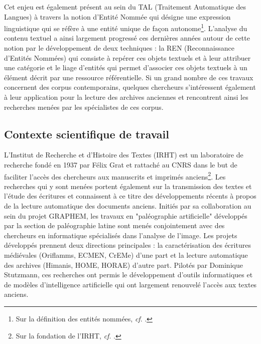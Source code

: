 \documentclass[a4paper,12pt,twoside]{book}
\begin{document}
	Cet enjeu est également présent au sein du TAL (Traitement Automatique des Langues) à travers la notion d'Entité Nommée qui désigne une expression linguistique qui se réfère à une entité unique de façon autonome\footnote{Sur la définition des entités nommées, \textit{cf}. \cite[p. 167--170]{ehrmann_les_2008}.}. L'analyse du contenu textuel a ainsi largement progressé ces dernières années autour de cette notion par le développement de deux techniques : la REN (Reconnaissance d'Entités Nommées) qui consiste à repérer ces objets textuels et à leur attribuer une catégorie et le liage d'entités qui permet d'associer ces objets textuels à un élément décrit par une ressource référentielle. Si un grand nombre de ces travaux concernent des corpus contemporains, quelques chercheurs s'intéressent également à leur application pour la lecture des archives anciennes et rencontrent ainsi les recherches menées par les spécialistes de ces corpus.
	
	\subsection*{Contexte scientifique de travail}
	
	L'Institut de Recherche et d'Histoire des Textes (IRHT) est un laboratoire de recherche fondé en 1937 par Félix Grat et rattaché au CNRS dans le but de faciliter l'accès des chercheurs aux manuscrits et imprimés anciens\footnote{Sur la fondation de l'IRHT, \textit{cf}. \cite{holtz_les_2000}.}. Les recherches qui y sont menées portent également sur la transmission des textes et l'étude des écritures et connaissent à ce titre des développements récents à propos de la lecture automatique des documents anciens. Initiés par sa collaboration au sein du projet GRAPHEM, les travaux en "paléographie artificielle" développés par la section de paléographie latine sont menés conjointement avec des chercheurs en informatique spécialisés dans l'analyse de l'image. Les projets développés prennent deux directions principales : la caractérisation des écritures médiévales (Oriflamms, ECMEN, CrEMe) d'une part et la lecture automatique des archives (Himanis, HOME, HORAE) d'autre part. Pilotés par Dominique Stutzmann, ces recherches ont permis le développement d'outils informatiques et de modèles d'intelligence artificielle qui ont largement renouvelé l'accès aux textes anciens.
	
\end{document}
